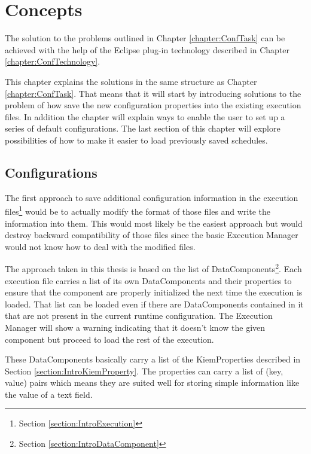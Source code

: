 \chapter{Concepts}
\label{chapter:ConfConcepts}
The solution to the problems outlined in Chapter \ref{chapter:ConfTask} can be achieved with
the help of the Eclipse plug-in technology described in Chapter \ref{chapter:ConfTechnology}.

This chapter explains the solutions in the same structure as Chapter \ref{chapter:ConfTask}.
That means that it will start by introducing solutions to the problem of how save the new
configuration properties into the existing execution files. In addition the chapter will
explain ways to enable the user to set up a series of default configurations. The last
section of this chapter will explore possibilities of how to make it easier to load
previously saved schedules.

\section{Configurations}
\label{section:ConfConceptsConf}
The first approach to save additional configuration information in the execution files\footnote{Section \ref{section:IntroExecution}} would
be to actually modify the format of those files and write the information into them.
This would most likely be the easiest approach but would destroy backward compatibility of
those files since the basic Execution Manager would not know how to deal with the modified files.

The approach taken in this thesis is based on the list of DataComponents\footnote{Section \ref{section:IntroDataComponent}}. Each execution file 
carries a list of its own DataComponents and their properties to ensure
that the component are properly initialized the next time the execution is loaded. That list
can be loaded even if there are DataComponents contained in it that are not present in the current
runtime configuration. The Execution Manager will show a warning indicating that it doesn't know the given
component but proceed to load the rest of the execution. 

These DataComponents basically carry a list of the KiemProperties described in Section \ref{section:IntroKiemProperty}.
The properties can carry a list of (key, value) pairs which means they are suited well for storing simple information like the value
of a text field.

